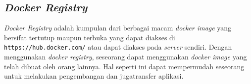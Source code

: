 \subsection{\textit{Docker Registry}}
\textit{Docker Registry} adalah kumpulan dari berbagai macam \textit{docker image} yang bersifat tertutup maupun terbuka yang dapat diakses di \texttt{https://hub.docker.com/} atau dapat diakses pada \textit{server} sendiri. Dengan menggunakan \textit{docker registry}, seseorang dapat menggunakan \textit{docker image} yang telah dibuat oleh orang lainnya. Hal seperti ini dapat mempermudah seseorang untuk melakukan pengembangan dan jugatransfer aplikasi. \cite{bab2-docker-registry}
